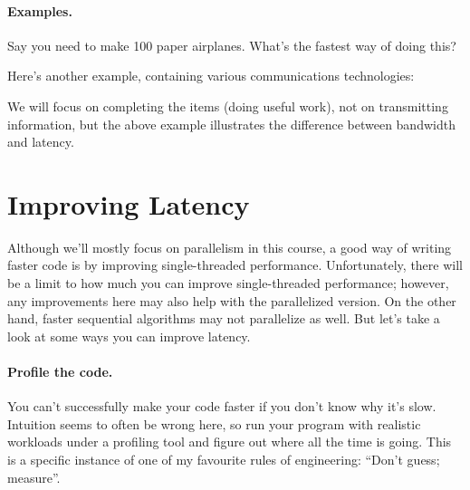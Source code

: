 \documentclass[a4paper]{report}
\begin{document}
\paragraph{Examples.} Say you need to make
100 paper airplanes. What's the fastest way of doing this?

\vspace*{7em}

Here's another example, containing various communications technologies:

\begin{center}
\end{center}


We will focus on completing the items (doing useful work), not on transmitting information, but the above example illustrates the difference between bandwidth and latency.

\section*{Improving Latency}
Although we'll mostly focus on parallelism in this course, a
good way of writing faster code is by improving single-threaded 
performance. Unfortunately, there will be a limit to how much you can
improve single-threaded performance; however, any improvements here
may also help with the parallelized version. On the other hand, faster
sequential algorithms may not parallelize as well. But let's take a look at some
ways you can improve latency.

\paragraph{Profile the code.} You can't successfully make your code 
faster if you don't know why it's slow. Intuition seems to often be
wrong here, so run your program with realistic workloads under a profiling
tool and figure out where all the time is going. This is a specific instance of one of my favourite rules of engineering: ``Don't guess; measure''. 
\end{document}

